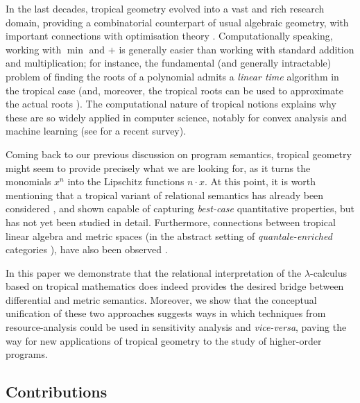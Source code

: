 In the last decades, tropical geometry evolved into a vast and rich research domain, providing a combinatorial counterpart of usual algebraic geometry, with important connections with optimisation theory \cite{Sturmfelds}.
Computationally speaking, working with $\min$ and $+$ is generally easier than working with standard addition and multiplication; for instance, the fundamental (and generally intractable) problem of finding the roots of a polynomial admits a \emph{linear time} algorithm in the tropical case (and, moreover,  the tropical roots can be used to approximate the actual roots \cite{Noferini2015}).
The computational nature of tropical notions explains why these are so widely applied in computer science, notably for convex analysis and machine learning (see \cite{Maragos2021} for a recent survey).

Coming back to our previous discussion on program semantics, tropical geometry might seem to provide precisely what we are looking for, as it turns the monomials $x^{n}$ into the Lipschitz functions $n\cdot x$.
At this point, it is worth mentioning that a tropical variant of relational semantics has already been considered \cite{Manzo2013}, and shown capable of capturing \emph{best-case} quantitative properties, but has not yet been studied in detail. Furthermore, connections between tropical linear algebra and metric spaces (in the abstract setting of \emph{quantale-enriched} categories \cite{Hofmann2014, Stubbe2014}), have also been observed \cite{Fuji}.

In this paper we demonstrate that the relational interpretation of the $\lambda$-calculus based on tropical mathematics does indeed provides the desired bridge between differential and metric semantics. Moreover, we show that the conceptual unification of these two approaches suggests ways in which techniques from resource-analysis could be used in sensitivity analysis and \emph{vice-versa}, paving the way for new  applications of tropical geometry to the  study of higher-order programs.


\subsection{Contributions}

